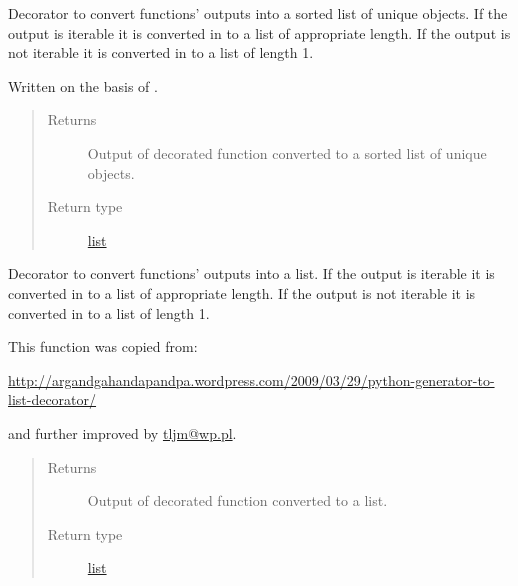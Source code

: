 \documentclass[a4paper,10pt,english]{sphinxmanual}
\begin{document}

\begin{fulllineitems}
\label{aqueduct.utils.helpers:aqueduct.utils.helpers.uniqify}
Decorator to convert functions' outputs into a sorted list of unique objects. If the output is iterable it is
converted in to a list of appropriate length. If the output is not iterable it is converted in to a list of length 1.

Written on the basis of {\hyperref[aqueduct.utils.helpers:aqueduct.utils.helpers.listify]{}}.
\begin{quote}\begin{description}
\item[{Returns}] \leavevmode
Output of decorated function converted to a sorted list of unique objects.

\item[{Return type}] \leavevmode
\href{https://docs.python.org/2/library/functions.html\#list}{list}

\end{description}\end{quote}

\end{fulllineitems}


\begin{fulllineitems}
\label{aqueduct.utils.helpers:aqueduct.utils.helpers.listify}
Decorator to convert functions' outputs into a list. If the output is iterable it is converted in to a list
of appropriate length. If the output is not iterable it is converted in to a list of length 1.

This function was copied from:

\url{http://argandgahandapandpa.wordpress.com/2009/03/29/python-generator-to-list-decorator/}

and further improved by \href{mailto:tljm@wp.pl}{tljm@wp.pl}.
\begin{quote}\begin{description}
\item[{Returns}] \leavevmode
Output of decorated function converted to a list.

\item[{Return type}] \leavevmode
\href{https://docs.python.org/2/library/functions.html\#list}{list}

\end{description}\end{quote}

\end{fulllineitems}
\end{document}
